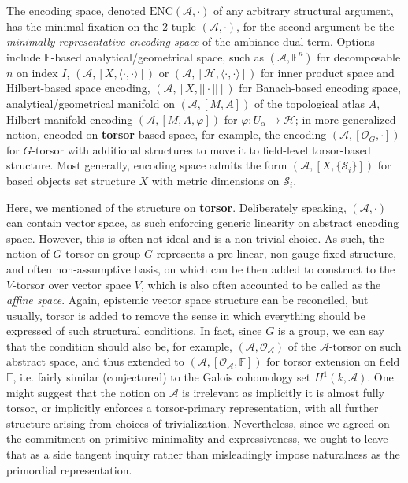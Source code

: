 \begin{definition}
  The encoding space, denoted $\mathrm{ENC}(\mathcal{A},\cdot)$ of any arbitrary structural argument, has the minimal fixation on the 2-tuple $(\mathcal{A},\cdot)$, for the second argument be the \textit{minimally representative encoding space} of the ambiance dual term. Options include $\mathbb{F}$-based analytical/geometrical space, such as $(\mathcal{A},\mathbb{F}^{n})$ for decomposable $n$ on index $I$, $(\mathcal{A},[X,\langle\cdot,\cdot\rangle])$ or $(\mathcal{A},[\mathcal{H},\langle\cdot,\cdot\rangle])$ for inner product space and Hilbert-based space encoding, $(\mathcal{A},[X,||\cdot||])$ for Banach-based encoding space, analytical/geometrical manifold on $(\mathcal{A},[M,A])$ of the topological atlas $A$, Hilbert manifold encoding $(\mathcal{A},[M,A,\varphi])$ for $\varphi:U_{\alpha}\to\mathcal{H}$; in more generalized notion, encoded on \textbf{torsor}-based space, for example, the encoding $(\mathcal{A},[\mathcal{O}_{G},\cdot])$ for $G$-torsor with additional structures to move it to field-level torsor-based structure. Most generally, encoding space admits the form $(\mathcal{A},[X,\{\mathcal{S}_{i}\}])$ for based objects set structure $X$ with metric dimensions on $\mathcal{S}_{i}$. 
\end{definition}

Here, we mentioned of the structure on \textbf{torsor}. Deliberately speaking, $(\mathcal{A},\cdot)$ can contain vector space, as such enforcing generic linearity on abstract encoding space. However, this is often not ideal and is a non-trivial choice. As such, the notion of $G$-torsor on group $G$ represents a pre-linear, non-gauge-fixed structure, and often non-assumptive basis, on which can be then added to construct to the $V$-torsor over vector space $V$, which is also often accounted to be called as the \textit{affine space}. Again, epistemic vector space structure can be reconciled, but usually, torsor is added to remove the sense in which everything should be expressed of such structural conditions. In fact, since $G$ is a group, we can say that the condition should also be, for example, $(\mathcal{A},\mathcal{O}_{\mathcal{A}})$ of the $\mathcal{A}$-torsor on such abstract space, and thus extended to $(\mathcal{A},[\mathcal{O}_{\mathcal{A}},\mathbb{F}])$ for torsor extension on field $\mathbb{F}$, i.e. fairly similar (conjectured) to the Galois cohomology set $H^{1}(k,\mathcal{A})$. One might suggest that the notion on $\mathcal{A}$ is irrelevant as implicitly it is almost fully torsor, or implicitly enforces a torsor-primary representation, with all further structure arising from choices of trivialization. Nevertheless, since we agreed on the commitment on primitive minimality and expressiveness, we ought to leave that as a side tangent inquiry rather than misleadingly impose naturalness as the primordial representation. 

